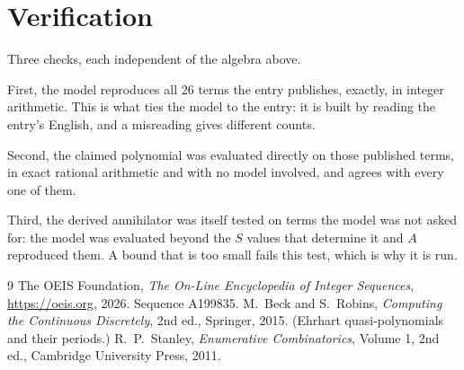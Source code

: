 \documentclass[11pt,a4paper]{article}
\theoremstyle{plain}
\theoremstyle{definition}
\begin{document}
\section{Verification}

Three checks, each independent of the algebra above.

First, the model reproduces all $26$ terms the entry publishes, exactly, in integer
arithmetic. This is what ties the model to the entry: it is built by reading the entry's
English, and a misreading gives different counts.

Second, the claimed polynomial was evaluated directly on those published terms, in exact
rational arithmetic and with no model involved, and agrees with every one of them.

Third, the derived annihilator was itself tested on terms the model was not asked for: the
model was evaluated beyond the $S$ values that determine it and $A$ reproduced them. A bound
that is too small fails this test, which is why it is run.

\begin{thebibliography}{9}
 The OEIS Foundation, \emph{The On-Line Encyclopedia of Integer
Sequences}, \url{https://oeis.org}, 2026. Sequence A199835.
 M.~Beck and S.~Robins, \emph{Computing the Continuous Discretely},
2nd ed., Springer, 2015. (Ehrhart quasi-polynomials and their periods.)
 R.~P.~Stanley, \emph{Enumerative Combinatorics}, Volume 1, 2nd ed.,
Cambridge University Press, 2011.
\end{thebibliography}
\end{document}
